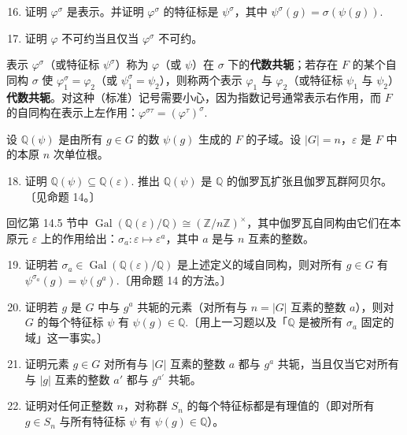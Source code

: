 \begin{enumerate}
\setcounter{enumi}{15}
\item 证明 \(\varphi^\sigma\) 是表示。并证明 \(\varphi^\sigma\) 的特征标是 \(\psi^\sigma\)，其中 \(\psi^\sigma(g) = \sigma(\psi(g))\).

\item 证明 \(\varphi\) 不可约当且仅当 \(\varphi^\sigma\) 不可约。
\end{enumerate}

表示 \(\varphi^\sigma\)（或特征标 \(\psi^\sigma\)）称为 \(\varphi\)（或 \(\psi\)）在 \(\sigma\) 下的\textbf{代数共轭}；若存在 \(F\) 的某个自同构 \(\sigma\) 使 \(\varphi_1^\sigma = \varphi_2\)（或 \(\psi_1^\sigma = \psi_2\)），则称两个表示 \(\varphi_1\) 与 \(\varphi_2\)（或特征标 \(\psi_1\) 与 \(\psi_2\)）\textbf{代数共轭}。对这种（标准）记号需要小心，因为指数记号通常表示右作用，而 \(F\) 的自同构在表示上左作用：\(\varphi^{\sigma\tau} = (\varphi^\tau)^\sigma\).

设 \(\mathbb{Q}(\psi)\) 是由所有 \(g \in G\) 的数 \(\psi(g)\) 生成的 \(F\) 的子域。设 \(|G| = n\)，\(\varepsilon\) 是 \(F\) 中的本原 \(n\) 次单位根。

\begin{enumerate}
\setcounter{enumi}{17}
\item 证明 \(\mathbb{Q}(\psi) \subseteq \mathbb{Q}(\varepsilon)\). 推出 \(\mathbb{Q}(\psi)\) 是 \(\mathbb{Q}\) 的伽罗瓦扩张且伽罗瓦群阿贝尔。〔见命题 14。〕
\end{enumerate}

回忆第 14.5 节中 \(\operatorname{Gal}(\mathbb{Q}(\varepsilon)/\mathbb{Q}) \cong (\mathbb{Z}/n\mathbb{Z})^\times\)，其中伽罗瓦自同构由它们在本原元 \(\varepsilon\) 上的作用给出：\(\sigma_a : \varepsilon \mapsto \varepsilon^a\)，其中 \(a\) 是与 \(n\) 互素的整数。

\begin{enumerate}
\setcounter{enumi}{18}
\item 证明若 \(\sigma_a \in \operatorname{Gal}(\mathbb{Q}(\varepsilon)/\mathbb{Q})\) 是上述定义的域自同构，则对所有 \(g \in G\) 有 \(\psi^{\sigma_a}(g) = \psi(g^a)\).〔用命题 14 的方法。〕

\item 证明若 \(g\) 是 \(G\) 中与 \(g^a\) 共轭的元素（对所有与 \(n = |G|\) 互素的整数 \(a\)），则对 \(G\) 的每个特征标 \(\psi\) 有 \(\psi(g) \in \mathbb{Q}\).〔用上一习题以及「\(\mathbb{Q}\) 是被所有 \(\sigma_a\) 固定的域」这一事实。〕

\item 证明元素 \(g \in G\) 对所有与 \(|G|\) 互素的整数 \(a\) 都与 \(g^a\) 共轭，当且仅当它对所有与 \(|g|\) 互素的整数 \(a'\) 都与 \(g^{a'}\) 共轭。

\item 证明对任何正整数 \(n\)，对称群 \(S_n\) 的每个特征标都是有理值的（即对所有 \(g \in S_n\) 与所有特征标 \(\psi\) 有 \(\psi(g) \in \mathbb{Q}\)）。
\end{enumerate}

